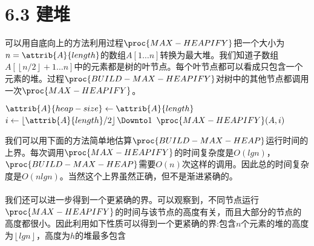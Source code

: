 \documentclass[a4paper,11pt]{article}
\newcommand{\floor}[1]{\left\lfloor #1 \right\rfloor}
\begin{document}
\section*{6.3 建堆}
可以用自底向上的方法利用过程$\proc{MAX-HEAPIFY}$把一个大小为$n=\attrib{A}{length}$的数组$A[1 \dots n]$转换为最大堆。我们知道子数组$A[\floor{n/2}+1\dots n]$中的元素都是树的叶节点。每个叶节点都可以看成只包含一个元素的堆。过程$\proc{BUILD-MAX-HEAPIFY}$对树中的其他节点都调用一次$\proc{MAX-HEAPIFY}$。
\begin{codebox}
	\li $\attrib{A}{heap-size} \gets \attrib{A}{length}$
	\li \For $i \gets \floor{\attrib{A}{length}/2} \Downto 1 $
	\li		\Then
				$\proc{MAX-HEAPIFY}(A,i)$
			\End
\end{codebox}
我们可以用下面的方法简单地估算$\proc{BUILD-MAX-HEAP}$运行时间的上界。每次调用$\proc{MAX-HEAPIFY}$的时间复杂度是$O(lgn)$，$\proc{BUILD-MAX-HEAP}$需要$O(n)$次这样的调用。因此总的时间复杂度是$O(nlgn)$。当然这个上界虽然正确，但不是渐进紧确的。
\paragraph*{}我们还可以进一步得到一个更紧确的界。可以观察到，不同节点运行$\proc{MAX-HEAPIFY}$的时间与该节点的高度有关，而且大部分的节点的高度都很小。因此利用如下性质可以得到一个更紧确的界:包含$n$个元素的堆的高度为$\floor{lgn}$，高度为$h$的堆最多包含
\end{document}
